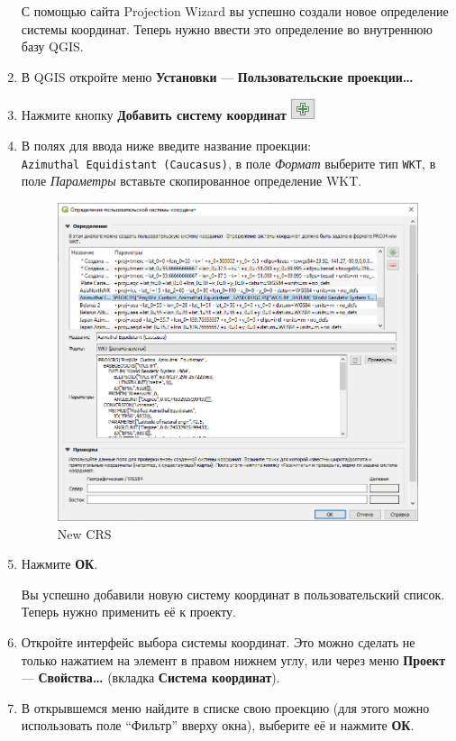 \documentclass[
  12pt,
]{book}
\begin{document}
\begin{enumerate}
  С помощью сайта Projection Wizard вы успешно создали новое определение системы координат. Теперь нужно ввести это определение во внутреннюю базу QGIS.
\item
  В QGIS откройте меню \textbf{Установки} --- \textbf{Пользовательские проекции\ldots{}}
\item
  Нажмите кнопку \textbf{Добавить систему координат} \includegraphics{images/Ex01/plus.png}
\item
  В полях для ввода ниже введите название проекции: \texttt{Azimuthal\ Equidistant\ (Caucasus)}, в поле \emph{Формат} выберите тип \texttt{WKT}, в поле \emph{Параметры} вставьте скопированное определение WKT.

  \begin{figure}
  \centering
  \includegraphics{images/Ex01/NewCRS.png}
  \caption{New CRS}
  \end{figure}
\item
  Нажмите \textbf{ОК}.

  Вы успешно добавили новую систему координат в пользовательский список. Теперь нужно применить её к проекту.
\item
  Откройте интерфейс выбора системы координат. Это можно сделать не только нажатием на элемент в правом нижнем углу, или через меню \textbf{Проект} --- \textbf{Свойства\ldots{}} (вкладка \textbf{Система координат}).
\item
  В открывшемся меню найдите в списке свою проекцию (для этого можно использовать поле ``Фильтр'' вверху окна), выберите её и нажмите \textbf{ОК}.
\end{enumerate}
\end{document}
